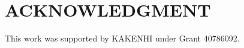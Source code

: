 \documentclass[letterpaper, 10 pt, conference]{ieeeconf}  %
\begin{document}




























%

\section*{ACKNOWLEDGMENT}

This work was supported by KAKENHI under Grant 40786092.
\begin{comment}
This work was supported by JST COI Grant Number JPMJCE1317.
本研究は、JST、COI、JPMJCE1317 の支援を受けたものである/です。

This work was supported by JST-Mirai Program Grant Number JPMJMI17C6, Japan. 
本研究は、JST、未来社会創造事業、JPMJMI17C6の支援を受けたものである/ものです。
\end{comment}






\end{document}
